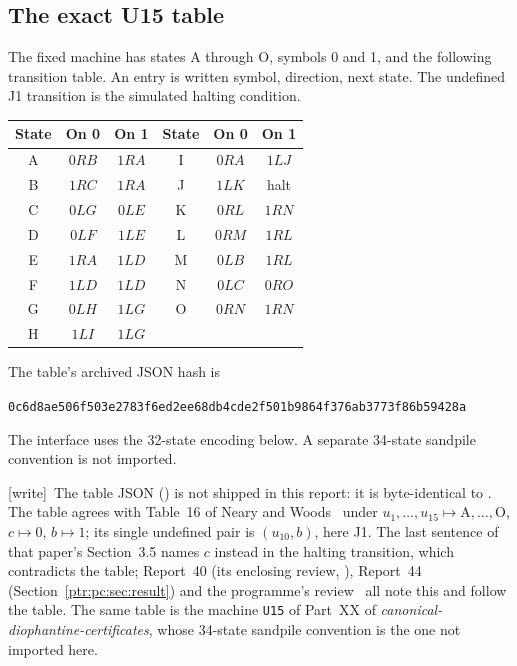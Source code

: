 \documentclass[11pt,letterpaper]{article}
\theoremstyle{definition}\newtheorem{definition}[theorem]{Definition}
\theoremstyle{remark}\newtheorem{remark}[theorem]{Remark}
\newcommand{\codeu}[1]{\nolinkurl{#1}}
\newcommand{\wtag}{\textup{[write]}}
\begin{document}
\subsection{The exact U15 table}
The fixed machine has states A through O, symbols 0 and 1, and the following transition table. An entry is written symbol, direction, next state. The undefined J1 transition is the simulated halting condition.
\begin{center}
\begin{tabular}{ccc@{\qquad}ccc}
\toprule
State & On 0 & On 1 & State & On 0 & On 1\\\midrule
A & $0RB$ & $1RA$ & I & $0RA$ & $1LJ$\\
B & $1RC$ & $1RA$ & J & $1LK$ & halt\\
C & $0LG$ & $0LE$ & K & $0RL$ & $1RN$\\
D & $0LF$ & $1LE$ & L & $0RM$ & $1RL$\\
E & $1RA$ & $1LD$ & M & $0LB$ & $1RL$\\
F & $1LD$ & $1LD$ & N & $0LC$ & $0RO$\\
G & $0LH$ & $1LG$ & O & $0RN$ & $1RN$\\
H & $1LI$ & $1LG$ & & &\\\bottomrule
\end{tabular}
\end{center}
The table's archived JSON hash is
\begin{center}\small\codeu{0c6d8ae506f503e2783f6ed2ee68db4cde2f501b9864f376ab3773f86b59428a}\end{center}
The interface uses the 32-state encoding below. A separate 34-state sandpile convention is not imported.

{\small\wtag\ The table JSON () is not shipped in
this report: it is byte-identical to
.
The table agrees with Table~16 of Neary and Woods~\cite{ptr:la:neary} under
$u_1,\ldots,u_{15}\mapsto\mathrm A,\ldots,\mathrm O$, $c\mapsto0$, $b\mapsto1$;
its single undefined pair is $(u_{10},b)$, here J1. The last sentence of that
paper's Section~3.5 names $c$ instead in the halting transition, which
contradicts the table; Report~40 (its enclosing review,
), Report~44
(Section~\ref{ptr:pc:sec:result}) and the programme's
review~\cite{ptr:w:rev4048} all note this and follow the table. The same
table is the machine \texttt{U15} of Part~XX of
\emph{canonical-diophantine-certificates}, whose 34-state sandpile convention
is the one not imported here.\par}
\end{document}
